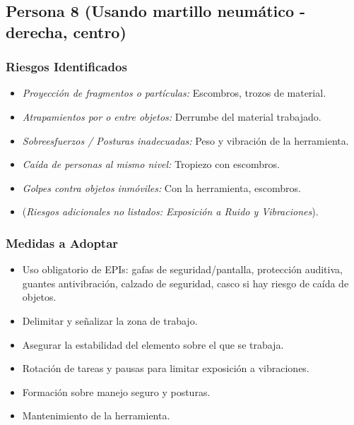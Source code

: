 \documentclass[12pt,a4paper]{article}
\begin{document}
	\bigskip\hrulefill\bigskip
	
	\subsection{Persona 8 (Usando martillo neumático - derecha, centro)}
	
	\subsubsection{Riesgos Identificados}
	\begin{itemize}
		\item \textit{Proyección de fragmentos o partículas:} Escombros, trozos de material.
		\item \textit{Atrapamientos por o entre objetos:} Derrumbe del material trabajado.
		\item \textit{Sobreesfuerzos / Posturas inadecuadas:} Peso y vibración de la herramienta.
		\item \textit{Caída de personas al mismo nivel:} Tropiezo con escombros.
		\item \textit{Golpes contra objetos inmóviles:} Con la herramienta, escombros.
		\item (\textit{Riesgos adicionales no listados: Exposición a Ruido y Vibraciones}).
	\end{itemize}
	
	\subsubsection{Medidas a Adoptar}
	\begin{itemize}
		\item Uso obligatorio de EPIs: gafas de seguridad/pantalla, protección auditiva, guantes antivibración, calzado de seguridad, casco si hay riesgo de caída de objetos.
		\item Delimitar y señalizar la zona de trabajo.
		\item Asegurar la estabilidad del elemento sobre el que se trabaja.
		\item Rotación de tareas y pausas para limitar exposición a vibraciones.
		\item Formación sobre manejo seguro y posturas.
		\item Mantenimiento de la herramienta.
	\end{itemize}
	
\end{document}
